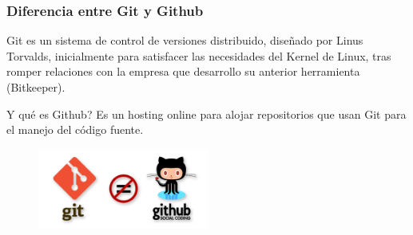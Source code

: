 \begin{frame}[fragile]
    \frametitle{Diferencia entre Git y Github}
        Git es un sistema de control de versiones distribuido, diseñado por
        Linus Torvalds, inicialmente para satisfacer las necesidades del
        Kernel de Linux, tras romper relaciones con la empresa que desarrollo
        su anterior herramienta (Bitkeeper).



Y qu\'e es Github? Es un hosting online para alojar repositorios que usan Git para el manejo del c\'odigo fuente.


\begin{figure}[t]
        \centering
        \includegraphics[width=0.5\textwidth]{Images/1.png}
\end{figure}



\end{frame}
